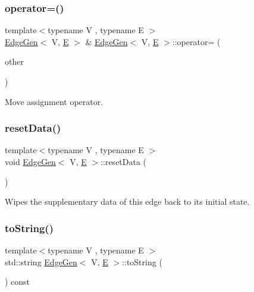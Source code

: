 \subsubsection{\texorpdfstring{operator=()}{operator=()}\hspace{0.1cm}{\footnotesize\ttfamily [2/2]}}
{\footnotesize\ttfamily template$<$typename V , typename E $>$ \\
\mbox{\hyperlink{classEdgeGen}{Edge\+Gen}}$<$ V, \mbox{\hyperlink{gmath_8h_ab587ba72a9c23f238cb4fd70e2fdb545}{E}} $>$ \& \mbox{\hyperlink{classEdgeGen}{Edge\+Gen}}$<$ V, \mbox{\hyperlink{gmath_8h_ab587ba72a9c23f238cb4fd70e2fdb545}{E}} $>$\+::operator= (\begin{DoxyParamCaption}\item[{\mbox{\hyperlink{classEdgeGen}{Edge\+Gen}}$<$ V, \mbox{\hyperlink{gmath_8h_ab587ba72a9c23f238cb4fd70e2fdb545}{E}} $>$ \&\&}]{other }\end{DoxyParamCaption})}



Move assignment operator. 

\mbox{\label{classEdgeGen_acaf456f6fcda155c25ae4489153a2cbf}} 
\subsubsection{\texorpdfstring{reset\+Data()}{resetData()}}
{\footnotesize\ttfamily template$<$typename V , typename E $>$ \\
void \mbox{\hyperlink{classEdgeGen}{Edge\+Gen}}$<$ V, \mbox{\hyperlink{gmath_8h_ab587ba72a9c23f238cb4fd70e2fdb545}{E}} $>$\+::reset\+Data (\begin{DoxyParamCaption}{ }\end{DoxyParamCaption})}



Wipes the supplementary data of this edge back to its initial state. 

\mbox{\label{classEdgeGen_a33b48d2c020490a9ef88a16c1a90e3d2}} 
\subsubsection{\texorpdfstring{to\+String()}{toString()}}
{\footnotesize\ttfamily template$<$typename V , typename E $>$ \\
std\+::string \mbox{\hyperlink{classEdgeGen}{Edge\+Gen}}$<$ V, \mbox{\hyperlink{gmath_8h_ab587ba72a9c23f238cb4fd70e2fdb545}{E}} $>$\+::to\+String (\begin{DoxyParamCaption}{ }\end{DoxyParamCaption}) const}



